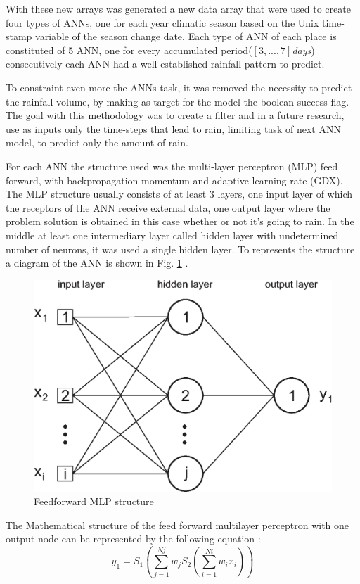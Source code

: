 With these new arrays was generated a new data array that were used to create four types of ANNs, one for each year climatic season based on the Unix time-stamp variable of the season change date.
Each type of ANN of each place is constituted of 5 ANN, one for every accumulated period($[3,...,7]$\textit{days}) consecutively each ANN had a well established rainfall pattern to predict.

To constraint even more the ANNs task, it was removed the necessity to predict the rainfall volume, by making as target for the model the boolean success flag. The goal with this methodology was to create a filter and in a future research, use as inputs only the time-steps that lead to rain,
limiting task of next ANN model, to predict only the amount of rain.

For each ANN the structure used was the multi-layer perceptron (MLP) feed forward, with backpropagation momentum and adaptive learning rate (GDX). The MLP structure usually consists of at least 3 layers, one input layer of which the receptors of the ANN receive external data, one output layer where the problem solution is obtained in this case whether or not it's going to rain. In the middle at least one intermediary layer called hidden layer with undetermined number of neurons, it was used a single hidden layer. To represents the structure a diagram of the ANN is shown in Fig. \ref{img:figure2} .

\begin{figure}[htb!]
 \centering
 \includegraphics[scale=0.75]{capitulo_2/diagram_ann}
 \caption{Feedforward MLP structure}
 \label{img:figure2}
\end{figure}
The Mathematical structure of the feed forward multilayer perceptron with one output node can be represented by the following equation \cite{luk2000study}:
\begin{equation}
 \label{eq:solve15}
 y_1 = S_1(\sum\limits_{j=1}^{Nj} w_j S_2(\sum\limits_{i=1}^{Ni} w_i x_i))
\end{equation}

